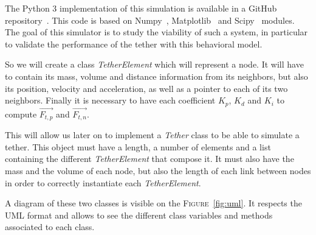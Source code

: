 The Python 3 implementation of this simulation is available in a GitHub repository~\cite{teusner_teusnertether_modeling_2021}. This code is based on Numpy~\cite{noauthor_numpy_nodate}, Matplotlib~\cite{noauthor_matplotlib_nodate} and Scipy~\cite{noauthor_scipyorg_nodate} modules. The goal of this simulator is to study the viability of such a system, in particular to validate the performance of the tether with this behavioral model.

So we will create a class \textit{TetherElement} which will represent a node. It will have to contain its mass, volume and distance information from its neighbors, but also its position, velocity and acceleration, as well as a pointer to each of its two neighbors. Finally it is necessary to have each coefficient $K_p$, $K_d$ and $K_i$ to compute $\overrightarrow{F_{t, p}}$ and $\overrightarrow{F_{t, n}}$.

This will allow us later on to implement a \textit{Tether} class to be able to simulate a tether. This object must have a length, a number of elements and a list containing the different \textit{TetherElement} that compose it. It must also have the mass and the volume of each node, but also the length of each link between nodes in order to correctly instantiate each \textit{TetherElement}.

A diagram of these two classes is visible on the \textsc{Figure}~\ref{fig:uml}. It respects the \textsc{UML} format and allows to see the different class variables and methods associated to each class.

